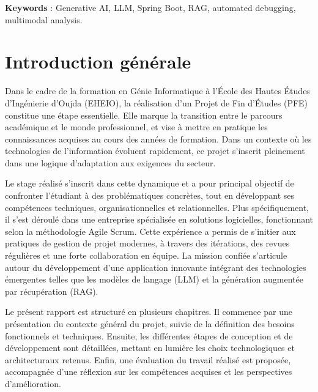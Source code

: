 \documentclass[12pt,a4paper]{report}
\begin{document}
	\textbf{Keywords} : Generative AI, LLM, Spring Boot, RAG, automated debugging, multimodal analysis.
	\thispagestyle{empty}

	
	\tableofcontents
	\thispagestyle{empty}
	
	\listoffigures
	\thispagestyle{empty}
	
	\listoftables
	\thispagestyle{empty}
	
	\clearpage
	\pagestyle{plain}
	
	\chapter*{Introduction générale}
	
	Dans le cadre de la formation en Génie Informatique à l’École des Hautes Études d’Ingénierie d’Oujda (EHEIO), la réalisation d’un Projet de Fin d’Études (PFE) constitue une étape essentielle. Elle marque la transition entre le parcours académique et le monde professionnel, et vise à mettre en pratique les connaissances acquises au cours des années de formation. Dans un contexte où les technologies de l’information évoluent rapidement, ce projet s’inscrit pleinement dans une logique d’adaptation aux exigences du secteur.
	
	Le stage réalisé s’inscrit dans cette dynamique et a pour principal objectif de confronter l’étudiant à des problématiques concrètes, tout en développant ses compétences techniques, organisationnelles et relationnelles. Plus spécifiquement, il s’est déroulé dans une entreprise spécialisée en solutions logicielles, fonctionnant selon la méthodologie Agile Scrum. Cette expérience a permis de s’initier aux pratiques de gestion de projet modernes, à travers des itérations, des revues régulières et une forte collaboration en équipe. La mission confiée s’articule autour du développement d’une application innovante intégrant des technologies émergentes telles que les modèles de langage (LLM) et la génération augmentée par récupération (RAG).
	
	Le présent rapport est structuré en plusieurs chapitres. Il commence par une présentation du contexte général du projet, suivie de la définition des besoins fonctionnels et techniques. Ensuite, les différentes étapes de conception et de développement sont détaillées, mettant en lumière les choix technologiques et architecturaux retenus. Enfin, une évaluation du travail réalisé est proposée, accompagnée d’une réflexion sur les compétences acquises et les perspectives d’amélioration.
	
\end{document}
